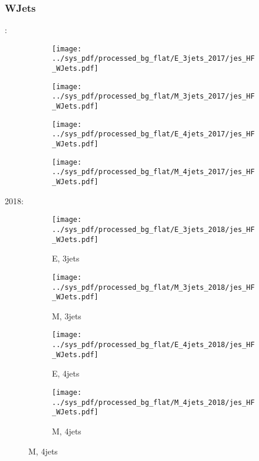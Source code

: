 \documentclass{beamer}
\begin{document}
\begin{frame}
\frametitle{WJets}
\fontsize{5}{1}:
\begin{figure}
\centering
\begin{subfigure}[b]{0.24\textwidth}
\texttt{[image: ../sys\_pdf/processed\_bg\_flat/E\_3jets\_2017/jes\_HF\_WJets.pdf]}
\end{subfigure}
\begin{subfigure}[b]{0.24\textwidth}
\texttt{[image: ../sys\_pdf/processed\_bg\_flat/M\_3jets\_2017/jes\_HF\_WJets.pdf]}
\end{subfigure}
\begin{subfigure}[b]{0.24\textwidth}
\texttt{[image: ../sys\_pdf/processed\_bg\_flat/E\_4jets\_2017/jes\_HF\_WJets.pdf]}
\end{subfigure}
\begin{subfigure}[b]{0.24\textwidth}
\texttt{[image: ../sys\_pdf/processed\_bg\_flat/M\_4jets\_2017/jes\_HF\_WJets.pdf]}
\end{subfigure}
\end{figure}
2018:
\begin{figure}
\centering
\begin{subfigure}[b]{0.24\textwidth}
\texttt{[image: ../sys\_pdf/processed\_bg\_flat/E\_3jets\_2018/jes\_HF\_WJets.pdf]}
\captionsetup{font=tiny}
\caption{E, 3jets}
\end{subfigure}
\begin{subfigure}[b]{0.24\textwidth}
\texttt{[image: ../sys\_pdf/processed\_bg\_flat/M\_3jets\_2018/jes\_HF\_WJets.pdf]}
\captionsetup{font=tiny}
\caption{M, 3jets}
\end{subfigure}
\begin{subfigure}[b]{0.24\textwidth}
\texttt{[image: ../sys\_pdf/processed\_bg\_flat/E\_4jets\_2018/jes\_HF\_WJets.pdf]}
\captionsetup{font=tiny}
\caption{E, 4jets}
\end{subfigure}
\begin{subfigure}[b]{0.24\textwidth}
\texttt{[image: ../sys\_pdf/processed\_bg\_flat/M\_4jets\_2018/jes\_HF\_WJets.pdf]}
\captionsetup{font=tiny}
\caption{M, 4jets}
\end{subfigure}
\end{figure}
\end{frame}
\end{document}
